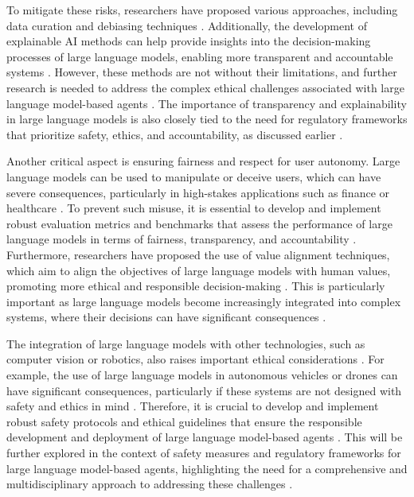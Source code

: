 \documentclass[11pt,a4paper]{article}
\begin{document}
To mitigate these risks, researchers have proposed various approaches, including data curation and debiasing techniques \cite{doi:10.1145/3605943}. Additionally, the development of explainable AI methods can help provide insights into the decision-making processes of large language models, enabling more transparent and accountable systems \cite{doi:10.3390/app14052074}. However, these methods are not without their limitations, and further research is needed to address the complex ethical challenges associated with large language model-based agents \cite{arxiv:2206.07682}. The importance of transparency and explainability in large language models is also closely tied to the need for regulatory frameworks that prioritize safety, ethics, and accountability, as discussed earlier \cite{arxiv:2309.14365}.

Another critical aspect is ensuring fairness and respect for user autonomy. Large language models can be used to manipulate or deceive users, which can have severe consequences, particularly in high-stakes applications such as finance or healthcare \cite{arxiv:2408.06361}. To prevent such misuse, it is essential to develop and implement robust evaluation metrics and benchmarks that assess the performance of large language models in terms of fairness, transparency, and accountability \cite{arxiv:2308.03688}. Furthermore, researchers have proposed the use of value alignment techniques, which aim to align the objectives of large language models with human values, promoting more ethical and responsible decision-making \cite{arxiv:2405.03207}. This is particularly important as large language models become increasingly integrated into complex systems, where their decisions can have significant consequences \cite{arxiv:2311.07226}.

The integration of large language models with other technologies, such as computer vision or robotics, also raises important ethical considerations \cite{arxiv:2402.16142}. For example, the use of large language models in autonomous vehicles or drones can have significant consequences, particularly if these systems are not designed with safety and ethics in mind \cite{arxiv:2402.14744}. Therefore, it is crucial to develop and implement robust safety protocols and ethical guidelines that ensure the responsible development and deployment of large language model-based agents \cite{doi:10.34133/research.0655}. This will be further explored in the context of safety measures and regulatory frameworks for large language model-based agents, highlighting the need for a comprehensive and multidisciplinary approach to addressing these challenges \cite{arxiv:2402.06196}.
\end{document}
